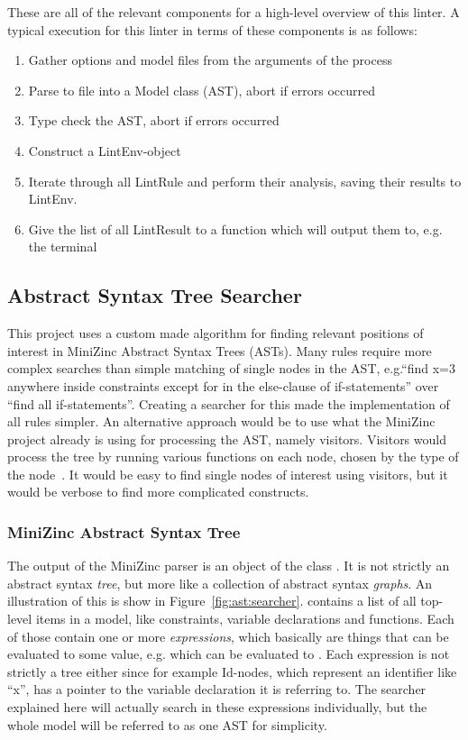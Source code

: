 \documentclass[a4paper,12pt]{article}
\newcommand{\mi}[1]{\mbox{\mzninline{#1}}}
\newcommand{\cpp}[1]{\mbox{\mznfont #1}}
\begin{document}
These are all of the relevant components for a high-level overview of this linter. A
typical execution for this linter in terms of these components is as follows:
\begin{enumerate}
  \item Gather options and model files from the arguments of the process
  \item Parse to file into a \cpp{Model} class (AST), abort if errors occurred
  \item Type check the AST, abort if errors occurred
  \item Construct a \cpp{LintEnv}-object
  \item Iterate through all \cpp{LintRule} and perform their analysis, saving their
  results to \cpp{LintEnv}.
  \item Give the list of all \cpp{LintResult} to a function which will output them to, e.g.\@
  the terminal
\end{enumerate}

\subsection{Abstract Syntax Tree Searcher}\label{sec:searcher}
This project uses a custom made algorithm for finding relevant positions of interest in
MiniZinc Abstract Syntax Trees (ASTs). Many rules require more complex searches than
simple matching of single nodes in the AST, e.g.\@ ``find x=3 anywhere inside constraints
except for in the else-clause of if-statements'' over ``find all if-statements''. Creating
a searcher for this made the implementation of all rules simpler. An alternative
approach would be to use what the MiniZinc project already is using for processing the
AST, namely visitors. Visitors would process the tree by running various functions on each
node, chosen by the type of the node~\cite[p.~331]{DesignPatterns94}. It would be easy to find
single nodes of interest using visitors, but it would be verbose to find
more complicated constructs.

\subsubsection{MiniZinc Abstract Syntax Tree}


The output of the MiniZinc parser is an object of the class \mi{Model}. It is not strictly
an abstract syntax \emph{tree}, but more like a collection of abstract syntax
\emph{graphs}. An illustration of this is show in Figure~\ref{fig:ast:searcher}.
\mi{Model} contains a list of all top-level items in a model, like constraints, variable
declarations and functions. Each of those contain one or more \emph{expressions}, which
basically are things that can be evaluated to some value, e.g.\@ \mi{1+1} which can be
evaluated to \mi{2}. Each expression is not strictly a tree either since for example
\cpp{Id}-nodes, which represent an identifier like ``x'', has a pointer to the variable
declaration it is referring to. The searcher explained here will actually search in these
expressions individually, but the whole model will be referred to as one AST for
simplicity.
\end{document}
